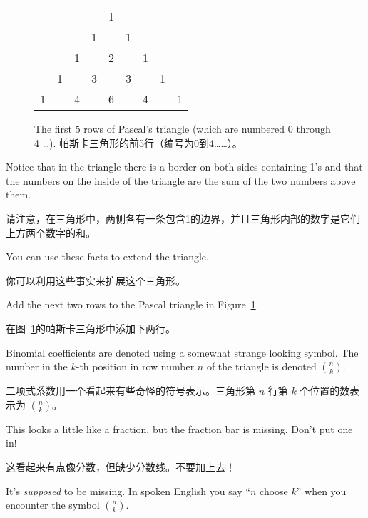 \begin{figure}[!hbt]
\begin{center}
\begin{tabular}{ccccccccc}
 & & & & 1 & & & & \\
 & & & 1 & & 1 & & & \\
 & & 1 &  & 2 &  
 & 1 & & \\ 
 & 1 & & 3 & & 3 & & 1 & \\
1 & & 4 & & 6 & & 4 & & 1 \\
\end{tabular}
\end{center}

\vspace{.2in}

\caption[Pascal's triangle.]{The first $5$ rows of Pascal's triangle (which are numbered 0 through 4 \ldots). 帕斯卡三角形的前5行（编号为0到4……）。}
\label{fig:pascal}
\end{figure}

Notice that in the triangle there is a border on both sides containing
1's and that the numbers on the inside of the triangle are the sum of the
two numbers above them.

请注意，在三角形中，两侧各有一条包含1的边界，并且三角形内部的数字是它们上方两个数字的和。

You can use these facts to extend the triangle.

你可以利用这些事实来扩展这个三角形。

\begin{exer}
Add the next two rows to the Pascal triangle in Figure~\ref{fig:pascal}.
\end{exer}

\begin{exer}
在图~\ref{fig:pascal}的帕斯卡三角形中添加下两行。
\end{exer}

Binomial coefficients are denoted using a somewhat strange looking
symbol.  The number in the $k$-th position in row number $n$ of
the triangle is denoted $\displaystyle \binom{n}{k}$.

二项式系数用一个看起来有些奇怪的符号表示。三角形第 $n$ 行第 $k$ 个位置的数表示为 $\displaystyle \binom{n}{k}$。

This looks 
a little like a fraction, but the fraction bar is missing.  Don't
put one in!

这看起来有点像分数，但缺少分数线。不要加上去！

It's \emph{supposed} to be missing.  In spoken English
you say ``$n$ choose $k$'' when you encounter the symbol $\displaystyle \binom{n}{k}$.

